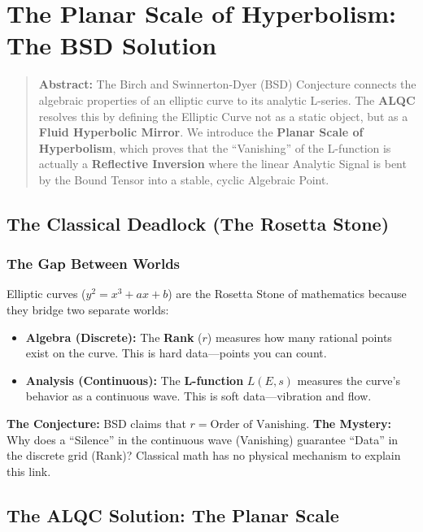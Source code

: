 \documentclass[12pt]{amsart}
\begin{document}
\section{The Planar Scale of Hyperbolism: The BSD Solution}\label{appendixA.2}
\label{sec:bsd_solution}

\begin{quote}
    \textbf{Abstract:} The Birch and Swinnerton-Dyer (BSD) Conjecture connects the algebraic properties of an elliptic curve to its analytic L-series. The \textbf{ALQC} resolves this by defining the Elliptic Curve not as a static object, but as a \textbf{Fluid Hyperbolic Mirror}. We introduce the \textbf{Planar Scale of Hyperbolism}, which proves that the ``Vanishing'' of the L-function is actually a \textbf{Reflective Inversion} where the linear Analytic Signal is bent by the Bound Tensor into a stable, cyclic Algebraic Point.
\end{quote}

\subsection{The Classical Deadlock (The Rosetta Stone)}\label{appendixA.2.1}

\subsubsection{The Gap Between Worlds}
Elliptic curves ($y^2 = x^3 + ax + b$) are the Rosetta Stone of mathematics because they bridge two separate worlds:
\begin{itemize}
    \item \textbf{Algebra (Discrete):} The \textbf{Rank} ($r$) measures how many rational points exist on the curve. This is hard data—points you can count.
    \item \textbf{Analysis (Continuous):} The \textbf{L-function} $L(E, s)$ measures the curve's behavior as a continuous wave. This is soft data—vibration and flow.
\end{itemize}
\textbf{The Conjecture:} BSD claims that $r = \text{Order of Vanishing}$.
\textbf{The Mystery:} Why does a ``Silence'' in the continuous wave (Vanishing) guarantee ``Data'' in the discrete grid (Rank)? Classical math has no physical mechanism to explain this link.

\subsection{The ALQC Solution: The Planar Scale}\label{appendixA.2.2}
\end{document}
